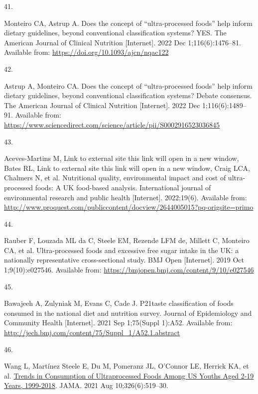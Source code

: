 \documentclass[
]{article}
\newlength{\cslhangindent}
\newlength{\csllabelwidth}
\newlength{\cslentryspacingunit} %
\newenvironment{CSLReferences}[2] %
 {%
  \setlength{\parindent}{0pt}
  \ifodd #1
  \let\oldpar\par
  \def\par{\hangindent=\cslhangindent\oldpar}
  \fi
  \setlength{\parskip}{#2\cslentryspacingunit}
 }%
 {}
\newcommand{\CSLLeftMargin}[1]{\parbox[t]{\csllabelwidth}{#1}}
\newcommand{\CSLRightInline}[1]{\parbox[t]{\linewidth - \csllabelwidth}{#1}\break}
\begin{document}
\begin{CSLReferences}{0}{0}
\leavevmode{}%
\CSLLeftMargin{41. }%
\CSLRightInline{Monteiro CA, Astrup A. Does the concept of
{``}ultra-processed foods{''} help inform dietary guidelines, beyond
conventional classification systems? YES. The American Journal of
Clinical Nutrition {[}Internet{]}. 2022 Dec 1;116(6):1476--81. Available
from: \url{https://doi.org/10.1093/ajcn/nqac122}}

\leavevmode{}%
\CSLLeftMargin{42. }%
\CSLRightInline{Astrup A, Monteiro CA. Does the concept of
{``}ultra-processed foods{''} help inform dietary guidelines, beyond
conventional classification systems? Debate consensus. The American
Journal of Clinical Nutrition {[}Internet{]}. 2022 Dec
1;116(6):1489--91. Available from:
\url{https://www.sciencedirect.com/science/article/pii/S0002916523036845}}

\leavevmode{}%
\CSLLeftMargin{43. }%
\CSLRightInline{Aceves-Martins M, Link to external site this link will
open in a new window, Bates RL, Link to external site this link will
open in a new window, Craig LCA, Chalmers N, et al. Nutritional quality,
environmental impact and cost of ultra-processed foods: A UK food-based
analysis. International journal of environmental research and public
health {[}Internet{]}. 2022;19(6). Available from:
\url{http://www.proquest.com/publiccontent/docview/2644005015?pq-origsite=primo}}

\leavevmode{}%
\CSLLeftMargin{44. }%
\CSLRightInline{Rauber F, Louzada ML da C, Steele EM, Rezende LFM de,
Millett C, Monteiro CA, et al. Ultra-processed foods and excessive free
sugar intake in the UK: a nationally representative cross-sectional
study. BMJ Open {[}Internet{]}. 2019 Oct 1;9(10):e027546. Available
from: \url{https://bmjopen.bmj.com/content/9/10/e027546}}

\leavevmode{}%
\CSLLeftMargin{45. }%
\CSLRightInline{Bawajeeh A, Zulyniak M, Evans C, Cade J.
P21{\hspace{0.25em}}taste classification of foods consumed in the
national diet and nutrition survey. Journal of Epidemiology and
Community Health {[}Internet{]}. 2021 Sep 1;75(Suppl 1):A52. Available
from: \url{http://jech.bmj.com/content/75/Suppl_1/A52.1.abstract}}

\leavevmode{}%
\CSLLeftMargin{46. }%
\CSLRightInline{Wang L, Martínez Steele E, Du M, Pomeranz JL, O'Connor
LE, Herrick KA, et al.
\href{https://doi.org/10.1001/jama.2021.10238}{Trends in Consumption of
Ultraprocessed Foods Among US Youths Aged 2-19 Years, 1999-2018}. JAMA.
2021 Aug 10;326(6):519--30. }


\end{CSLReferences}
\end{document}
